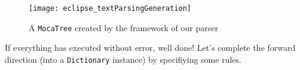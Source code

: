 \vspace{0.5cm}

\begin{figure}[!htbp]
\begin{center}
 \texttt{[image: eclipse\_textParsingGeneration]}
  \caption{A \texttt{MocaTree} created by the framework of our parser}
  \label{eclipse:treeResult}
\end{center}
\end{figure}

\vspace{0.5cm}

If everything has executed without error, well done! Let's complete the forward direction (into a \texttt{Dictionary} instance) by specifiying some rules.
